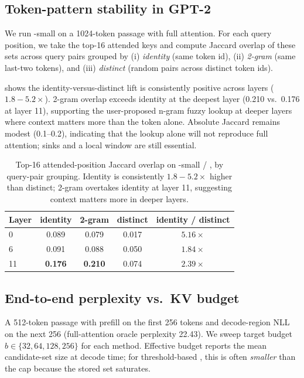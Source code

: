 \subsection{Token-pattern stability in GPT-2}
\label{sec:results:stability}

 We run \gpttwo-small on a 1024-token \wikitext passage with full attention. For each query position, we take the top-16 attended keys and compute Jaccard overlap of these sets across query pairs grouped by (i) \emph{identity} (same token id), (ii) \emph{2-gram} (same last-two tokens), and (iii) \emph{distinct} (random pairs across distinct token ids).

  shows the identity-versus-distinct lift is consistently positive across layers ($1.8{-}5.2\times$). 2-gram overlap exceeds identity at the deepest layer (0.210 vs.\ 0.176 at layer 11), supporting the user-proposed n-gram fuzzy lookup at deeper layers where context matters more than the token alone. Absolute Jaccard remains modest (0.1--0.2), indicating that the lookup alone will not reproduce full attention; sinks and a local window are still essential.

\begin{table}[h]
\centering
\caption{Top-16 attended-position Jaccard overlap on \gpttwo-small / \wikitext, by query-pair grouping. Identity is consistently $1.8{-}5.2\times$ higher than distinct; 2-gram overtakes identity at layer 11, suggesting context matters more in deeper layers.}
\label{tab:exp2}
\begin{tabular}{@{}lcccc@{}}
\toprule
\textbf{Layer} & \textbf{identity} & \textbf{2-gram} & \textbf{distinct} & \textbf{identity / distinct} \\
\midrule
0  & 0.089 & 0.079 & 0.017 & $5.16\times$ \\
6  & 0.091 & 0.088 & 0.050 & $1.84\times$ \\
11 & \textbf{0.176} & \textbf{0.210} & 0.074 & $2.39\times$ \\
\bottomrule
\end{tabular}
\end{table}

\subsection{End-to-end perplexity vs.\ KV budget}
\label{sec:results:ppl}

 A 512-token \wikitext passage with prefill on the first 256 tokens and decode-region NLL on the next 256 (full-attention oracle perplexity 22.43). We sweep target budget $b \in \{32, 64, 128, 256\}$ for each method. Effective budget reports the mean candidate-set size at decode time; for threshold-based \hma, this is often \emph{smaller} than the cap because the stored set saturates.

